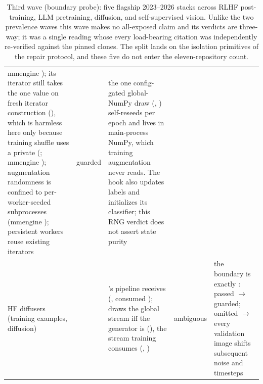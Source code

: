 \begin{table}[tbp]
\begin{tabular}{@{}L{2.0cm}L{1.1cm}L{5.9cm}L{1.6cm}L{3.3cm}@{}}
mmengine ); its iterator still takes the one
 value on fresh iterator construction
(), which is harmless here only because
training shuffle uses a private
 (; mmengine
); augmentation randomness is confined to
per-worker-seeded subprocesses (mmengine );
persistent workers reuse existing iterators &
guarded &
the one config-gated global-NumPy draw
(, ) self-reseeds per epoch and
lives in main-process NumPy, which training augmentation never reads.
The hook also updates labels and initializes its classifier; this RNG
verdict does not assert state purity \\
\addlinespace
HF diffusers (training examples, diffusion) &  &
's pipeline receives
(, consumed );
 draws the global stream iff the generator is
 (), the stream training
consumes (, ) &
ambiguous &
the boundary is exactly : passed $\to$ guarded; omitted
$\to$ every validation image shifts subsequent noise and timesteps \\
\bottomrule
\end{tabular}
\caption{Third wave (boundary probe): five flagship 2023--2026 stacks
across RLHF post-training, LLM pretraining, diffusion, and
self-supervised vision. Unlike the two prevalence waves this wave makes
no all-exposed claim and its verdicts are three-way; it was a single
reading whose every load-bearing citation was independently re-verified
against the pinned clones. The split lands on the isolation primitives
of the repair protocol, and these five do not enter the
eleven-repository count.}
\label{tab:modern}
\end{table}


